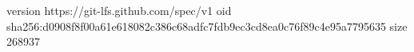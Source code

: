 version https://git-lfs.github.com/spec/v1
oid sha256:d0908f8f00a61e618082c386c68adfc7fdb9ec3cd8ea0c76f89c4e95a7795635
size 268937
